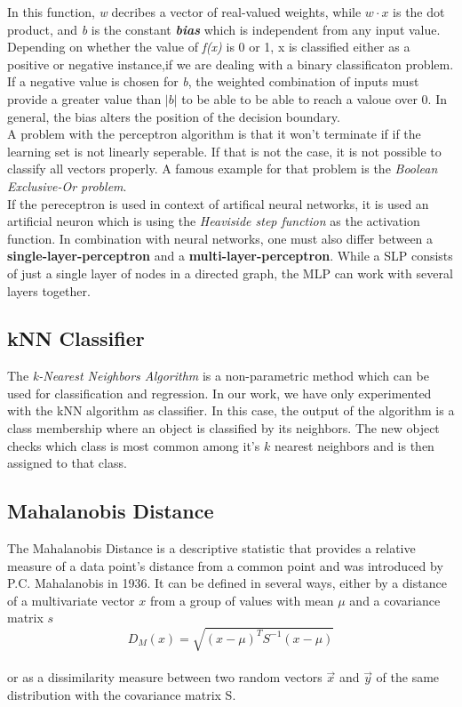 \documentclass{article}
\begin{document}
In this function, \emph{w} 	decribes a vector of real-valued weights, while $w \cdot x$ is the dot product, and \emph{b} is the constant \emph{\textbf{bias}} which is independent from any input value. Depending on whether the value of \emph{f(x)} is 0 or 1, x is classified either as a positive or negative instance,if we are dealing with a binary classificaton problem. If a negative value is chosen for \emph{b}, the weighted combination of inputs must provide a greater value than $|b|$ to be able to be able to reach a valoue over 0. In general, the bias alters the position of the decision boundary.
\\
A problem with the perceptron algorithm is that it won't terminate if if the learning set is not linearly seperable. If that is not the case, it is not possible to classify all vectors properly. A famous example for that problem is the \emph{Boolean Exclusive-Or problem}. 
\\
If the pereceptron is used in context of artifical neural networks, it is used an artificial neuron which is using the \emph{Heaviside step function} as the activation function. In combination with neural networks, one must also differ between a \textbf{single-layer-perceptron} and a \textbf{multi-layer-perceptron}. While a SLP consists of just a single layer of nodes in a directed graph, the MLP can work with several layers together.

\subsection{kNN Classifier}

The \emph{k-Nearest Neighbors Algorithm} is a non-parametric method which can be used for classification and regression. In our work, we have only experimented with the kNN algorithm as classifier. In this case, the output of the algorithm is a class membership where an object is classified by its neighbors. The new object checks which class is most common among it's $k$ nearest neighbors and is then assigned to that class. 

\subsection{Mahalanobis Distance}

The Mahalanobis Distance is a descriptive statistic that provides a relative measure of a data point's distance from a common point and was introduced by P.C. Mahalanobis in 1936. It can be defined in several ways, either by a distance of a multivariate vector $x$ from a group of values with mean $\mu$ and a covariance matrix $s$
\\
\begin{equation}
D_M(x) = \sqrt{(x-\mu)^TS^{-1}(x-\mu)}
\end{equation}
\\
or as a dissimilarity measure between two random vectors $\vec{x}$ and $\vec{y}$ of the same distribution with the covariance matrix S.
\end{document}
